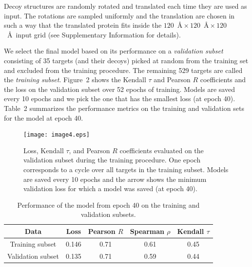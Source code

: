 \documentclass{bioinfo}
\begin{document}
Decoy structures are randomly rotated and translated each time they
are used as input. The rotations are sampled uniformly
\citep{shoemake1992uniform} and the translation are chosen in such a
way that the translated protein fits inside the $120$~\AA${}\times
120$~\AA${}\times 120$~\AA\ input grid (see Supplementary Information for
details).

We select the final model based on its performance on a
\emph{validation subset} consisting of 35 targets (and their decoys)
picked at random from the training set and excluded from the training
procedure. The remaining 529 targets are called the \emph{training
subset}.  Figure~2\vphantom{\ref{Fig:TrainingLoss}} shows the Kendall $\tau$ and
Pearson $R$ coefficients and the loss on the validation subset over 52
epochs of training.  Models are saved every 10 epochs and we pick the
one that has the smallest loss (at epoch 40).
Table~2\vphantom{\ref{Tbl:TrainingResults}} summarizes the performance metrics on
the training and validation sets for the model at epoch 40.

\begin{figure}[!tpb]
    \centering
    \texttt{[image: image4.eps]}
    \caption{Loss, Kendall $\tau$, and Pearson $R$ coefficients
      evaluated on the validation subset during the training
      procedure.  One epoch corresponds to a cycle over all targets in
      the training subset. Models are saved every 10 epochs and the
      arrow shows the minimum validation loss for which a model was
      saved (at epoch 40).}
    \label{Fig:TrainingLoss}
\end{figure}

\begin{table}[!t]
\begin{center}
\begin{tabular}{ c | c | c | c | c }
    Data & Loss & Pearson $R$ & Spearman $\rho$ & Kendall $\tau$ \\
    \hline
    Training subset     &0.146 &0.71 &0.61 &0.45 \\
    Validation subset   &0.135 &0.71 &0.59 &0.44 \\ \hline
\end{tabular}
    \caption {Performance of the model from epoch 40 on the training
      and validation subsets.}
    \label{Tbl:TrainingResults}
\end{center}
\end{table}
\end{document}
